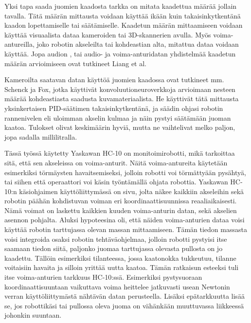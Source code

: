 Yksi tapa saada juomien kaadosta tarkka on mitata kaadettua määrää jollain tavalla. Tätä määrän mittausta voidaan käyttää ikään kuin takaisinkytkentänä kaadon lopettamiselle tai säätämiselle. Kaadetun määrän mittaamiseen voidaan käyttää visuaalista dataa kameroiden tai 3D-skannerien avulla. Myös voima-antureilla, joko robotin akseleilta tai kohdeastian alta, mitattua dataa voidaan käyttää. Jopa audion \cite{Liang2019}, tai audio- ja voima-anturidatan yhdistelmää \cite{Liang2020} kaadetun määrän arvioimiseen ovat tutkineet Liang et al.

Kameroilta saatavan datan käyttöä juomien kaadossa ovat tutkineet mm. Schenck ja Fox, jotka käyttivät konvoluutioneuroverkkoja arvioimaan nesteen määrää kohdeastiasta saadusta kuvamateriaalista. He käyttivät tätä mittausta yksinkertaisen PID-säätimen takaisinkytkentänä, ja säädin ohjasi robotin rannenivelen eli uloimman akselin kulmaa ja näin pystyi säätämään juoman kaatoa. Tulokset olivat keskimäärin hyviä, mutta ne vaihtelivat melko paljon, jopa sadalla millilitralla. \cite{Schenck2016}

Tässä työssä käytetty Yaskawan HC-10 on monitoimirobotti, mikä tarkoittaa sitä, että sen akseleissa on voima-anturit. Näitä voima-antureita käytetään esimerkiksi törmäysten havaitsemiseksi, jolloin robotti voi törmättyään pysähtyä, tai siihen että operaattori voi käsin työntämällä ohjata robottia. Yaskawan HC-10:n käsiohjaimen käyttöliittymässä on sivu, jolta näkee kaikkiin akseleihin sekä robotin päähän kohdistuvan voiman eri koordinaattisuunnissa reaaliaikaisesti. Nämä voimat on laskettu kaikkien kuuden voima-anturin datan, sekä akselien asennon pohjalta. \cite[s.10-11]{Yaskawa} Aluksi hypoteesina oli, että näiden voima-anturien dataa voisi käyttää robotin tarttujassa olevan massan mittaamiseen. Tämän tiedon massasta voisi integroida osaksi robotin tehtäväohjelmaa, jolloin robotti pystyisi itse saamaan tiedon siitä, paljonko juomaa tarttujassa olevasta pullosta on jo kaadettu. Tällöin esimerkiksi tilanteessa, jossa kaatonokka tukkeutuu, tilanne voitaisiin havaita ja silloin yrittää uutta kaatoa. Tämän ratkaisun esteeksi tuli itse voima-anturien tarkkuus HC-10:ssä. Esimerkiksi pystysuoraan koordinaattisuuntaan vaikuttava voima heittelee jatkuvasti usean Newtonin verran käyttöliittymästä nähtävän datan perusteella. Lisäksi epätarkkuutta lisää se, jos robottikäsi tai pullossa oleva juoma on vähänkään muuttuvassa liikkeessä johonkin suuntaan.

